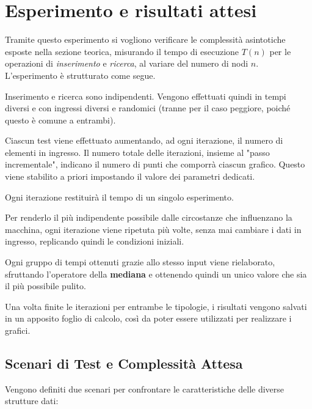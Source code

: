 \documentclass{article}
\begin{document}

\clearpage
\section{Esperimento e risultati attesi}
Tramite questo esperimento si vogliono verificare le complessità asintotiche esposte nella sezione teorica, misurando il tempo di esecuzione $T(n)$ per le operazioni di \textit{inserimento} e \textit{ricerca}, al variare del numero di nodi $n$. L'esperimento è strutturato come segue.

\bigskip
Inserimento e ricerca sono indipendenti. Vengono effettuati quindi in tempi diversi e con ingressi diversi e randomici (tranne per il caso peggiore, poiché questo è comune a entrambi).

Ciascun test viene effettuato aumentando, ad ogni iterazione, il numero di elementi in ingresso. Il numero totale delle iterazioni, insieme al "passo incrementale", indicano il numero di punti che comporrà ciascun grafico. Questo viene stabilito a priori impostando il valore dei parametri dedicati.

\bigskip
Ogni iterazione restituirà il tempo di un singolo esperimento.

Per renderlo il più indipendente possibile dalle circostanze che influenzano la macchina, ogni iterazione viene ripetuta più volte, senza mai cambiare i dati in ingresso, replicando quindi le condizioni iniziali.

Ogni gruppo di tempi ottenuti grazie allo stesso input viene rielaborato, sfruttando l'operatore della \textbf{mediana} e ottenendo quindi un unico valore che sia il più possibile pulito.

\bigskip
Una volta finite le iterazioni per entrambe le tipologie, i risultati vengono salvati in un apposito foglio di calcolo, così da poter essere utilizzati per realizzare i grafici.

\subsection{Scenari di Test e Complessità Attesa}
Vengono definiti due scenari per confrontare le caratteristiche delle diverse strutture dati:
\end{document}
